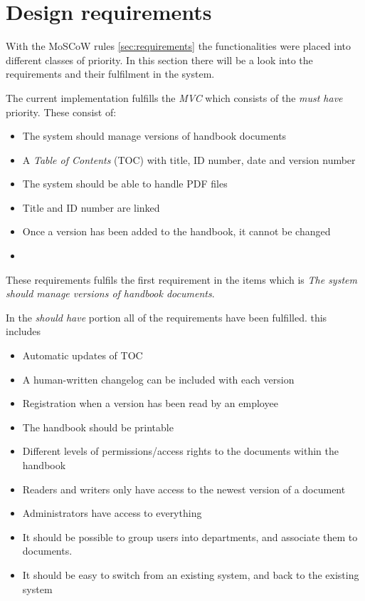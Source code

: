 \section{Design requirements}\label{sec:disdesignrequirements}
With the MoSCoW rules \cref{sec:requirements} the functionalities were placed into different classes of priority.
In this section there will be a look into the requirements and their fulfilment in the system.

The current implementation fulfills the \textit{MVC} which consists of the \textit{must have} priority.
These consist of:

\begin{itemize}
	\item 
	The system should manage versions of handbook documents
	\item 
    A \textit{Table of Contents} (TOC) with title, ID number, date and version number
    \item 
    The system should be able to handle PDF files
    \item 
    Title and ID number are linked
    \item 
    Once a version has been added to the handbook, it cannot be changed
	\item \end{itemize}

These requirements fulfils the first requirement in the items which is \textit{The system should manage versions of handbook documents}.

In the \textit{should have} portion all of the requirements have been fulfilled.
this includes 

\begin{itemize}
	\item 
	Automatic updates of TOC
    \item 
	A human-written changelog can be included with each version
	\item 
    Registration when a version has been read by an employee
    \item 
    The handbook should be printable
    \item 
   	Different levels of permissions/access rights to the documents within the handbook
    \item 
    Readers and writers only have access to the newest version of a document
    \item 
    Administrators have access to everything
   	\item 
    It should be possible to group users into departments, and associate them to documents.
    \item 
    It should be easy to switch from an existing system, and back to the existing system
\end{itemize}

